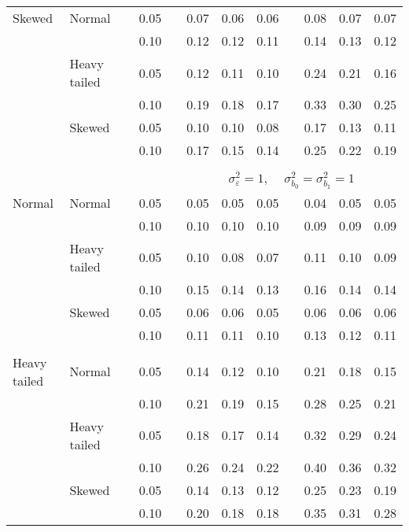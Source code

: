 \begin{table}[ht]
\begin{scriptsize}
\begin{center}
\begin{tabular}{ll p{.1cm} c p{.1cm} rrr p{.1cm} rrr}
Skewed       & Normal       && 0.05 &&  0.07 & 0.06 & 0.06 && 0.08 & 0.07 & 0.07 \\ 
             &              && 0.10 &&  0.12 & 0.12 & 0.11 && 0.14 & 0.13 & 0.12 \\ 
             & Heavy tailed && 0.05 &&  0.12 & 0.11 & 0.10 && 0.24 & 0.21 & 0.16 \\ 
             &              && 0.10 &&  0.19 & 0.18 & 0.17 && 0.33 & 0.30 & 0.25 \\ 
             & Skewed       && 0.05 &&  0.10 & 0.10 & 0.08 && 0.17 & 0.13 & 0.11 \\ 
             &              && 0.10 &&  0.17 & 0.15 & 0.14 && 0.25 & 0.22 & 0.19 \\ 

&&&&&&&&&&&\\
& && && \multicolumn{7}{c}{$\sigma_{\varepsilon}^2 = 1$, \ \ $\sigma_{b_0}^2 = \sigma_{b_1}^2 = 1$} \\ \cline{6-12}
\rowcolor{gray!20}Normal       & Normal       && 0.05 &&  0.05 & 0.05 & 0.05 && 0.04 & 0.05 & 0.05 \\ 
\rowcolor{gray!20}             &              && 0.10 &&  0.10 & 0.10 & 0.10 && 0.09 & 0.09 & 0.09 \\ 
\rowcolor{gray!20}             & Heavy tailed && 0.05 &&  0.10 & 0.08 & 0.07 && 0.11 & 0.10 & 0.09 \\ 
\rowcolor{gray!20}             &              && 0.10 &&  0.15 & 0.14 & 0.13 && 0.16 & 0.14 & 0.14 \\ 
\rowcolor{gray!20}             & Skewed       && 0.05 &&  0.06 & 0.06 & 0.05 && 0.06 & 0.06 & 0.06 \\ 
\rowcolor{gray!20}             &              && 0.10 &&  0.11 & 0.11 & 0.10 && 0.13 & 0.12 & 0.11 \\ 
             &&&&&&&&&&&\\
Heavy tailed & Normal       && 0.05 &&  0.14 & 0.12 & 0.10 && 0.21 & 0.18 & 0.15 \\ 
             &              && 0.10 &&  0.21 & 0.19 & 0.15 && 0.28 & 0.25 & 0.21 \\ 
             & Heavy tailed && 0.05 &&  0.18 & 0.17 & 0.14 && 0.32 & 0.29 & 0.24 \\ 
             &              && 0.10 &&  0.26 & 0.24 & 0.22 && 0.40 & 0.36 & 0.32 \\ 
             & Skewed       && 0.05 &&  0.14 & 0.13 & 0.12 && 0.25 & 0.23 & 0.19 \\ 
             &              && 0.10 &&  0.20 & 0.18 & 0.18 && 0.35 & 0.31 & 0.28 \\ 

\end{tabular}
\end{center}
\end{scriptsize}
\end{table}
